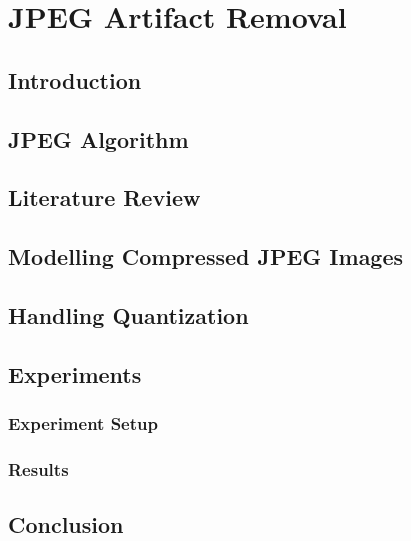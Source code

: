 \chapter{JPEG Artifact Removal}
\section{Introduction}
\section{JPEG Algorithm}
\section{Literature Review}
\section{Modelling Compressed JPEG Images}
\section{Handling Quantization}
\section{Experiments}
\subsection{Experiment Setup}
\subsection{Results}
\section{Conclusion}
